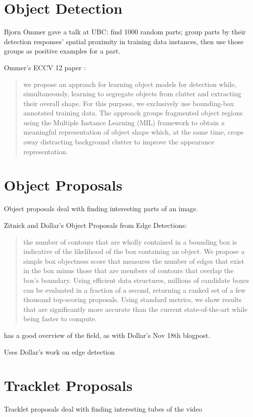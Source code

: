 \section{Object Detection}

Bjorn Ommer \cite{yarlagadda2014beyond, antic2014learning, eigenstetter2014randomized, monroy2012beyond} gave a talk at UBC: find 1000 random parts; group parts by their detection responses' spatial proximity in training data instances, then use those groups as positive examples for a part.

Ommer's ECCV 12 paper \cite{monroy2012beyond}:
\blockquote{we propose an approach for learning object models for detection
while, simultaneously, learning to segregate objects from clutter
and extracting their overall shape. For this purpose, we exclusively use
bounding-box annotated training data. The approach groups fragmented
object regions using the Multiple Instance Learning (MIL) framework to
obtain a meaningful representation of object shape which, at the same
time, crops away distracting background clutter to improve the appearance
representation.}

\section{Object Proposals}
Object proposals deal with finding interesting parts of an image.


Zitnick and Dollar's \cite{zitnick2014edge} Object Proposals from Edge Detections:
\blockquote{the number of contours that are wholly contained in a bounding box is indicative of the likelihood of the box containing an object. We propose a simple box objectness score that
measures the number of edges that exist in the box minus those that
are members of contours that overlap the box’s boundary. Using efficient
data structures, millions of candidate boxes can be evaluated in a fraction
of a second, returning a ranked set of a few thousand top-scoring proposals.
Using standard metrics, we show results that are significantly more
accurate than the current state-of-the-art while being faster to compute.}

\cite{zitnick2014edge} has a good overview of the field, as with Dollar's Nov 18th blogpost.

Uses Dollar's work on edge detection \cite{dollar2014fast}

\section{Tracklet Proposals}
Tracklet proposals deal with finding interesting tubes of the video

